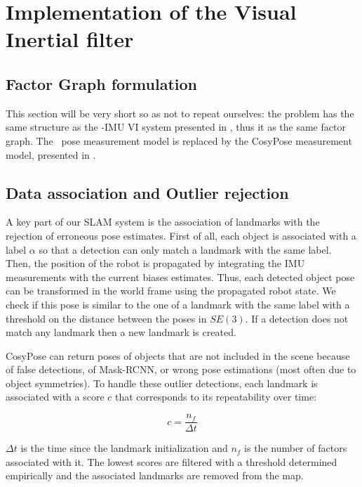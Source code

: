 \section{Implementation of the Visual Inertial filter}

\subsection{Factor Graph formulation}
This section will be very short so as not to repeat ourselves: the problem has the same structure as the \apriltag-IMU VI system presented in , 
thus it as the same factor graph. The \apriltag\ pose measurement model is replaced by the CosyPose measurement model, presented in .


\subsection{Data association and Outlier rejection}
A key part of our SLAM system is the association of landmarks with the rejection of erroneous pose estimates. First of all, each object is associated with a 
label $\alpha$ so that a detection can only match a landmark with the same label. Then, the position of the robot is propagated by integrating the IMU measurements 
with the current biases estimates. Thus, each detected object pose can be transformed in the world frame using the propagated robot state. We check if this pose is 
similar to the one of a landmark with the same label with a threshold on the distance between the poses in $SE(3)$. 
If a detection does not match any landmark then a new landmark is created.

CosyPose can return poses of objects that are not included in the scene because of false detections, of Mask-RCNN, or wrong pose estimations (most often due to object symmetries). 
To handle these outlier detections, each landmark is associated with a score $c$ that corresponds to its repeatability over time: 

\begin{equation}
    c = \frac{n_f}{\Delta t}
\end{equation}

$\Delta t$ is the time since the landmark initialization and $n_f$ is the number of factors associated with it.
The lowest scores are filtered with a threshold determined empirically and the associated landmarks are removed from the map.




